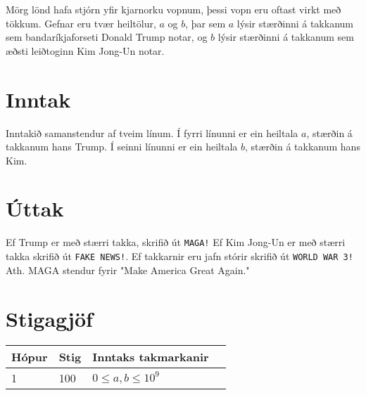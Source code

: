 Mörg lönd hafa stjórn yfir kjarnorku vopnum, þessi vopn eru oftast virkt með tökkum. Gefnar eru tvær heiltölur, $a$ og $b$, þar sem $a$ lýsir stærðinni á takkanum sem bandaríkjaforseti Donald Trump notar, og $b$ lýsir stærðinni á takkanum sem æðsti leiðtoginn Kim Jong-Un notar. 

\section*{Inntak}
Inntakið samanstendur af tveim línum.
Í fyrri línunni er ein heiltala $a$, stærðin á takkanum hans Trump.
Í seinni línunni er ein heiltala $b$, stærðin á takkanum hans Kim.

\section*{Úttak}
Ef Trump er með stærri takka, skrifið út \texttt{MAGA!} Ef Kim Jong-Un er með stærri takka skrifið út \texttt{FAKE NEWS!}. Ef takkarnir eru jafn stórir skrifið út \texttt{WORLD WAR 3!}
Ath. MAGA stendur fyrir "Make America Great Again."

\section*{Stigagjöf}
\begin{tabular}{|l|l|l|l|}
\hline
Hópur & Stig & Inntaks takmarkanir \\ \hline
1     & 100  & $0 \leq a,b \leq 10^9$ \\ \hline
\end{tabular}
